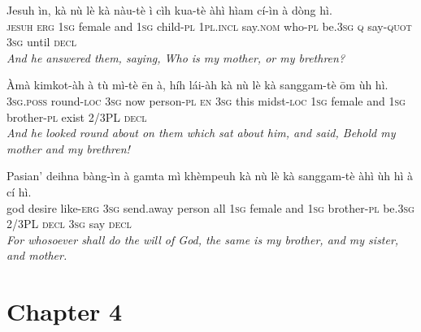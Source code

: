 \documentclass[11pt,a4paper]{article}
\begin{document}
\begin{exe}
\gll Jesuh ìn, kà nù lè kà nàu-tè ì cìh kua-tè àhì hìam cí-ìn à dòng hì. \\
     \textsc{jesuh} \textsc{erg} \textsc{1sg} female and \textsc{1sg} child-\textsc{pl} \textsc{1pl}.\textsc{incl} say.\textsc{nom} who-\textsc{pl} be.\textsc{3sg} \textsc{q} say-\textsc{quot} \textsc{3sg} until \textsc{decl} \\
\glt \textcolor{kjvcolor}{\textit{And he answered them, saying, Who is my mother, or my brethren?}}

\gll Àmà kimkot-àh à tù mì-tè ēn à, híh lái-àh kà nù lè kà sanggam-tè ōm ùh hì. \\
     \textsc{3sg}.\textsc{poss} round-\textsc{loc} \textsc{3sg} now person-\textsc{pl} \textsc{en} \textsc{3sg} this midst-\textsc{loc} \textsc{1sg} female and \textsc{1sg} brother-\textsc{pl} exist 2/3PL \textsc{decl} \\
\glt \textcolor{kjvcolor}{\textit{And he looked round about on them which sat about him, and said, Behold my mother and my brethren!}}

\gll Pasian' deihna bàng-ìn à gamta mì khèmpeuh kà nù lè kà sanggam-tè àhì ùh hì à cí hì. \\
     god desire like-\textsc{erg} \textsc{3sg} send.away person all \textsc{1sg} female and \textsc{1sg} brother-\textsc{pl} be.\textsc{3sg} 2/3PL \textsc{decl} \textsc{3sg} say \textsc{decl} \\
\glt \textcolor{kjvcolor}{\textit{For whosoever shall do the will of God, the same is my brother, and my sister, and mother.}}

\end{exe}
\newpage

\section*{Chapter 4}
\end{document}
